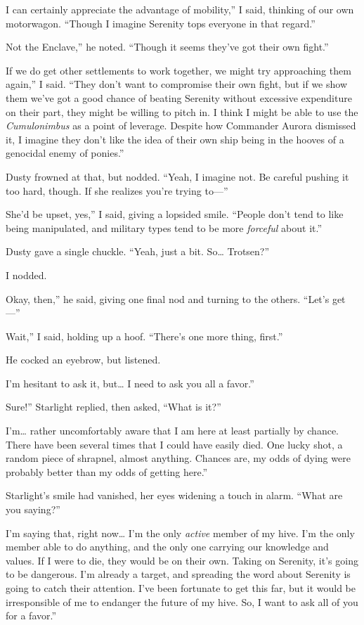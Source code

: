 \leavevmode{}I can certainly appreciate the advantage of mobility,” I said, thinking of our own motorwagon. “Though I imagine Serenity tops everyone in that regard.”

\leavevmode{}Not the Enclave,” he noted. “Though it seems they’ve got their own fight.”

\leavevmode{}If we do get other settlements to work together, we might try approaching them again,” I said. “They don’t want to compromise their own fight, but if we show them we’ve got a good chance of beating Serenity without excessive expenditure on their part, they might be willing to pitch in. I think I might be able to use the \textit{Cumulonimbus} as a point of leverage. Despite how Commander Aurora dismissed it, I imagine they don’t like the idea of their own ship being in the hooves of a genocidal enemy of ponies.”

Dusty frowned at that, but nodded. “Yeah, I imagine not. Be careful pushing it too hard, though. If she realizes you’re trying to—”

\leavevmode{}She’d be upset, yes,” I said, giving a lopsided smile. “People don’t tend to like being manipulated, and military types tend to be more \textit{forceful} about it.”

Dusty gave a single chuckle. “Yeah, just a bit. So… Trotsen?”

I nodded.

\leavevmode{}Okay, then,” he said, giving one final nod and turning to the others. “Let’s get—”

\leavevmode{}Wait,” I said, holding up a hoof. “There’s one more thing, first.”

He cocked an eyebrow, but listened.

\leavevmode{}I’m hesitant to ask it, but… I need to ask you all a favor.”

\leavevmode{}Sure!” Starlight replied, then asked, “What is it?”

\leavevmode{}I’m… rather uncomfortably aware that I am here at least partially by chance. There have been several times that I could have easily died. One lucky shot, a random piece of shrapnel, almost anything. Chances are, my odds of dying were probably better than my odds of getting here.”

Starlight’s smile had vanished, her eyes widening a touch in alarm. “What are you saying?”

\leavevmode{}I’m saying that, right now… I’m the only \textit{active} member of my hive. I’m the only member able to do anything, and the only one carrying our knowledge and values. If I were to die, they would be on their own. Taking on Serenity, it’s going to be dangerous. I’m already a target, and spreading the word about Serenity is going to catch their attention. I’ve been fortunate to get this far, but it would be irresponsible of me to endanger the future of my hive. So, I want to ask all of you for a favor.”


